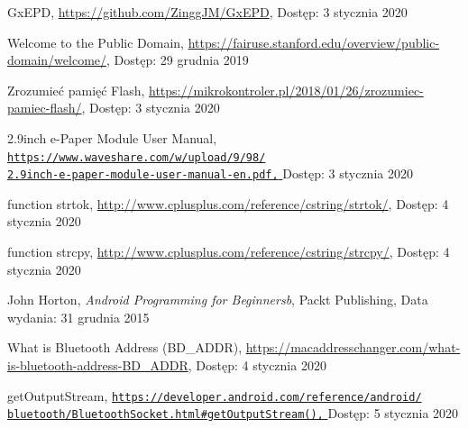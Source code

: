 \documentclass[a4paper,12pt, twoside]{article}
\begin{document}
\begin{thebibliography}{}
    		GxEPD,
    		\newline\url{https://github.com/ZinggJM/GxEPD}, 
    		\newline Dostęp: 3 stycznia 2020
    		
    		Welcome to the Public Domain,
    		\newline\url{https://fairuse.stanford.edu/overview/public-domain/welcome/}, 
    		\newline Dostęp: 29 grudnia 2019
    		
    		Zrozumieć pamięć Flash,
    		\newline\url{https://mikrokontroler.pl/2018/01/26/zrozumiec-pamiec-flash/}, 
    		\newline Dostęp: 3 stycznia 2020
    		
    		2.9inch e-Paper Module User Manual,
    		\newline\href{https://www.waveshare.com/w/upload/9/98/2.9inch-e-paper-module-user-manual-en.pdf}
    		 {\nolinkurl{https://www.waveshare.com/w/upload/9/98/}
                 \\
                  \nolinkurl{2.9inch-e-paper-module-user-manual-en.pdf,}
                 }
    		\newline Dostęp: 3 stycznia 2020
    		
    		function strtok,
    		\newline\url{http://www.cplusplus.com/reference/cstring/strtok/}, 
    		\newline Dostęp: 4 stycznia 2020
    		
    		function strcpy,
    		\newline\url{http://www.cplusplus.com/reference/cstring/strcpy/}, 
    		\newline Dostęp: 4 stycznia 2020
    		
    	    John Horton, \textit{Android Programming for Beginnersb}, Packt Publishing,
    		\newline Data wydania: 31 grudnia 2015
    		
    		What is Bluetooth Address (BD\_ADDR),
    		\newline\url{https://macaddresschanger.com/what-is-bluetooth-address-BD_ADDR}, 
    		\newline Dostęp: 4 stycznia 2020
    		
    		getOutputStream,
    		\newline\href{https://developer.android.com/reference/android/bluetooth/BluetoothSocket.html\#getOutputStream()}
    		 {\nolinkurl{https://developer.android.com/reference/android/}
                 \\
                  \nolinkurl{bluetooth/BluetoothSocket.html\#getOutputStream(),}
                 }
    		\newline Dostęp: 5 stycznia 2020
    		

\end{thebibliography}
\end{document}
